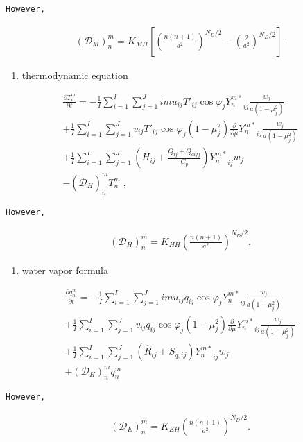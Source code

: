 \begin{verbatim}
However,
\end{verbatim}

\begin{eqnarray}
({\mathcal D}_M)_n^m = K_{MH} \left[ 
                            \left( \frac{n(n+1)}{a^{2}} \right)^{N_D/2}
                            - \left( \frac{2}{a^2} \right)^{N_D/2}
                            \right]  .
\end{eqnarray}

\begin{enumerate}
\def\labelenumi{\arabic{enumi}.}
\setcounter{enumi}{2}
\tightlist
\item
  thermodynamic equation
\end{enumerate}

\begin{eqnarray}
  \frac{\partial T_n^m}{\partial t}
   =  - \frac{1}{I} \sum_{i=1}^{I} \sum_{j=1}^{J}  
          im u_{ij} T'_{ij} \cos\varphi_j
          {Y_n^{m *}}_{ij}
         \frac{w_j}{a(1-\mu_j^{2})} 
          \\
     + \frac{1}{I} \sum_{i=1}^{I} \sum_{j=1}^{J}  
          v_{ij} T'_{ij} \cos\varphi_j
          (1-\mu_j^2) 
          \frac{\partial }{\partial \mu} {Y_n^{m *}}_{ij}
          \frac{w_j}{a(1-\mu_j^{2})} 
          \\
     + \frac{1}{I} \sum_{i=1}^{I} \sum_{j=1}^{J}  
          \left( H_{ij} + \frac{Q_{ij}+Q_{diff}}{C_{p}} \right)
          {Y_n^{m *}}_{ij} w_j
          \\ 
     - (\tilde{\mathcal D}_H)_n^m T_n^m \; ,
\end{eqnarray}

\begin{verbatim}
However,
\end{verbatim}

\begin{eqnarray}
({\mathcal D}_H)_n^m 
   =  K_{HH} \left( \frac{n(n+1)}{a^{2}} \right)^{N_D/2} .
\end{eqnarray}

\begin{enumerate}
\def\labelenumi{\arabic{enumi}.}
\setcounter{enumi}{3}
\tightlist
\item
  water vapor formula
\end{enumerate}

\begin{eqnarray}
  \frac{\partial q_n^m}{\partial t}
   =  - \frac{1}{I} \sum_{i=1}^{I} \sum_{j=1}^{J}  
          im u_{ij} q_{ij} \cos\varphi_j
          {Y_n^{m *}}_{ij} \frac{w_j}{a(1-\mu_j^{2})} 
          \\
     + \frac{1}{I} \sum_{i=1}^{I} \sum_{j=1}^{J}  
          v_{ij} q_{ij} \cos\varphi_j
          (1-\mu_j^2) 
          \frac{\partial }{\partial \mu} {Y_n^{m *}}_{ij}
          \frac{w_j}{a(1-\mu_j^{2})} 
          \\
     + \frac{1}{I} \sum_{i=1}^{I} \sum_{j=1}^{J}  
          \left( \hat{R}_{ij} + S_{q,ij} \right)
          {Y_n^{m *}}_{ij} w_j
          \\ 
     + ({\mathcal D}_H)_n^m q_n^m
\end{eqnarray}

\begin{verbatim}
However,
\end{verbatim}

\begin{eqnarray}
({\mathcal D}_E)_n^m 
   =  K_{EH} \left( \frac{n(n+1)}{a^{2}} \right)^{N_D/2} .
\end{eqnarray}
